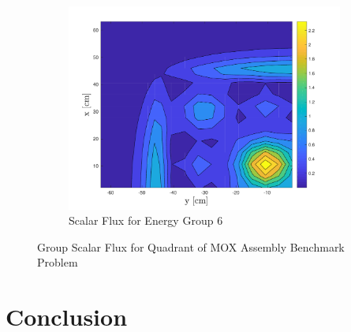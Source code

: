 \begin{figure}[!htbp]\ContinuedFloat
\centering
\begin{subfigure}[b]{0.75\textwidth}
        \includegraphics[width=\textwidth]{Figures/HigherDimEigen/AlphaScalarFluxRQ_g=6}
        \caption{Scalar Flux for Energy Group 6}
   \label{fig:2DScalarFluxAlpha6} 
\end{subfigure}
\caption{Group Scalar Flux for Quadrant of MOX Assembly Benchmark Problem}
\end{figure}

\section{Conclusion}